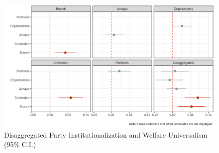 \documentclass[11pt]{article}
\begin{document}
\begin{figure}[!htbt]
	\centering
	\includegraphics[width=0.85\linewidth]{"../3. Datasets_Codebooks/Figures/Plot4"}
	\caption{ Disaggregated Party Institutionalization and Welfare Universalism (95\% C.I.)}
	\label{fig:plot4}
\end{figure}



%



%

\end{document}
